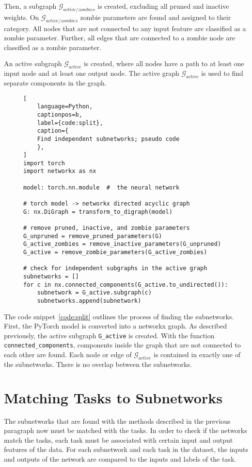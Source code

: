 Then, a subgraph $\mathcal{G}_{active/zombies}$ is created, excluding all pruned and inactive weights.
On $\mathcal{G}_{active/zombies}$ zombie parameters are found and assigned to their category. 
All nodes that are not connected to any input feature are classified as a zombie parameter. 
Further, all edges that are connected to a zombie node are classified as a zombie parameter.

An active subgraph $\mathcal{G}_{active}$ is created, where all nodes have a path to at least one input node and at least one output node.
The active graph $\mathcal{G}_{active}$ is used to find separate components in the graph.

\begin{figure}[ht]
\centering
\begin{minipage}{\linewidth}
\begin{lstlisting}[
    language=Python,
    captionpos=b, 
    label={code:split},
    caption={
    Find independent subnetworks; pseudo code
    },
]
import torch
import networkx as nx

model: torch.nn.module  #  the neural network

# torch model -> networkx directed acyclic graph
G: nx.DiGraph = transform_to_digraph(model)

# remove pruned, inactive, and zombie parameters
G_unpruned = remove_pruned_parameters(G)
G_active_zombies = remove_inactive_parameters(G_unpruned)
G_active = remove_zombie_parameters(G_active_zombies)

# check for independent subgraphs in the active graph
subnetworks = []
for c in nx.connected_components(G_active.to_undirected()):
    subnetwork = G_active.subgraph(c)
    subnetworks.append(subnetwork)
\end{lstlisting}
\end{minipage}
\end{figure}

The code snippet~\ref{code:split} outlines the process of finding the subnetworks.
First, the PyTorch model is converted into a networkx graph.
As described previously, the active subgraph \lstinline{G_active} is created.
With the function \lstinline{connected_components}, components inside the graph that are not connected to each other are found.
Each node or edge of $\mathcal{G}_{active}$ is contained in exactly one of the subnetworks.
There is no overlap between the subnetworks.

\section{Matching Tasks to Subnetworks}\label{sec:taskmatch}
The subnetworks that are found with the methods described in the previous paragraph now must be matched with the tasks.
In order to check if the networks match the tasks, each task must be associated with certain input and output features of the data.
For each subnetwork and each task in the dataset, the inputs and outputs of the network are compared to the inputs and labels of the task.

